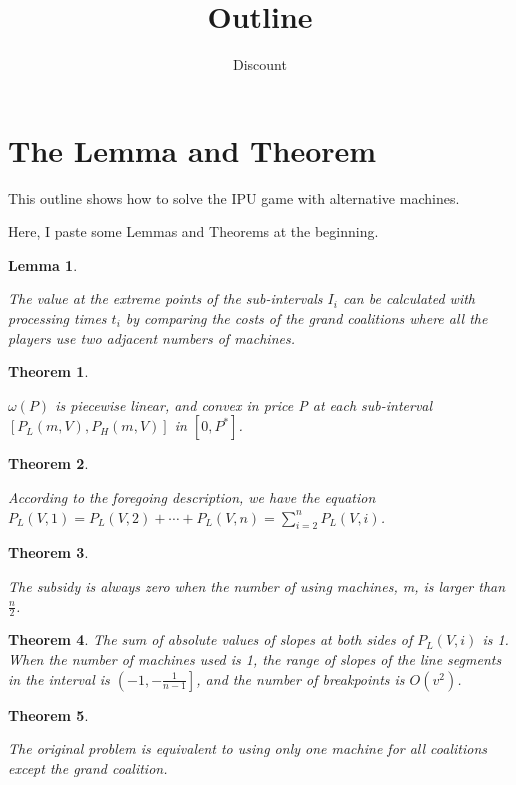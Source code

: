 \documentclass[UTF8]{article}
\title{Outline}
\author{Dis\cdot count}
\newtheorem{thm}{\hspace{2em}Theorem}
\newtheorem{lem}{\hspace{2em}Lemma}
\begin{document}
\maketitle{}


\section{The Lemma and Theorem}

This outline shows how to solve the IPU game with alternative machines.

Here, I paste some Lemmas and Theorems at the beginning.

\begin{lem}\label{lem1}

The value at the extreme points of the sub-intervals $I_i$ can be calculated with processing times $t_i$ by comparing the costs of the grand coalitions where all the players use two adjacent numbers of machines.

\end{lem}

\begin{thm}\label{thm1}

$\omega(P)$ is piecewise linear, and convex in price P at each sub-interval $[P_L(m,V),P_H(m,V)]$ in $[0,P^*] $.

\end{thm}

\begin{thm}\label{thm2}

According to the foregoing description, we have the equation $P_L(V,1)=P_L(V,2)+\cdots+P_L(V,n)=\sum_{i=2}^n P_L(V,i)$.

\end{thm}

\begin{thm}\label{thm3}

The subsidy is always zero when the number of using machines, m, is larger than $\frac{n}{2}$.

\end{thm}


\begin{thm}\label{thm4}
The sum of absolute values of slopes at both sides of $P_L(V,i)$ is 1.
When the number of machines used is 1, the range of slopes of the line segments in the interval is $\left( -1 , -\frac{1}{n-1} \right]$, and the number of breakpoints is $ O(v^2) $.
\end{thm}


\begin{thm}\label{thm5}

The original problem is equivalent to using only one machine for all coalitions except the grand coalition.

\end{thm}
\end{document}
